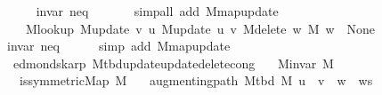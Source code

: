 \begin{isabellebody}
\ \ \ \ \isamarkupfalse%
\ invar{\isacharparenleft}{\kern0pt}{}{\isacharparenright}{\kern0pt}\ neq{\isacharparenleft}{\kern0pt}{}{\isacharcomma}{\kern0pt}\ {}{\isacharparenright}{\kern0pt}\isanewline
\ \ \ \ \isamarkupfalse%
\ {\isacharparenleft}{\kern0pt}simp{\isacharunderscore}{\kern0pt}all\ add{\isacharcolon}{\kern0pt}\ M{\isachardot}{\kern0pt}map{\isacharunderscore}{\kern0pt}update{\isacharparenright}{\kern0pt}\isanewline
\ \ \isamarkupfalse%
\isanewline
\ \ \ \ {\isachardoublequoteopen}M{\isacharunderscore}{\kern0pt}lookup\ {\isacharparenleft}{\kern0pt}M{\isacharunderscore}{\kern0pt}update\ v\ u\ {\isacharparenleft}{\kern0pt}M{\isacharunderscore}{\kern0pt}update\ u\ v\ {\isacharparenleft}{\kern0pt}M{\isacharunderscore}{\kern0pt}delete\ w\ M{\isacharparenright}{\kern0pt}{\isacharparenright}{\kern0pt}{\isacharparenright}{\kern0pt}\ w\ {\isacharequal}{\kern0pt}\ None{\isachardoublequoteclose}\isanewline
\ \ \ \ \isamarkupfalse%
\ invar{\isacharparenleft}{\kern0pt}{}{\isacharparenright}{\kern0pt}\ neq{\isacharparenleft}{\kern0pt}{}{\isacharparenright}{\kern0pt}\isanewline
\ \ \ \ \isamarkupfalse%
\ {\isacharparenleft}{\kern0pt}simp\ add{\isacharcolon}{\kern0pt}\ M{\isachardot}{\kern0pt}map{\isacharunderscore}{\kern0pt}update{\isacharparenright}{\kern0pt}\isanewline
{}\isamarkupfalse%
%
\endisatagproof
{\isafoldproof}%
%
\isadelimproof
\isanewline
%
\endisadelimproof
%
\isadeliminvisible
\isanewline
%
\endisadeliminvisible
%
\isataginvisible
{}\isamarkupfalse%
\ {\isacharparenleft}{\kern0pt}\ edmonds{\isacharunderscore}{\kern0pt}karp{\isacharparenright}{\kern0pt}\ M{\isacharunderscore}{\kern0pt}tbd{\isacharunderscore}{\kern0pt}update{\isacharunderscore}{\kern0pt}update{\isacharunderscore}{\kern0pt}delete{\isacharunderscore}{\kern0pt}cong{\isacharcolon}{\kern0pt}\isanewline
\ \ \ {\isachardoublequoteopen}M{\isachardot}{\kern0pt}invar\ M{\isachardoublequoteclose}\isanewline
\ \ \ {\isachardoublequoteopen}is{\isacharunderscore}{\kern0pt}symmetric{\isacharunderscore}{\kern0pt}Map\ M{\isachardoublequoteclose}\isanewline
\ \ \ {\isachardoublequoteopen}augmenting{\isacharunderscore}{\kern0pt}path\ {\isacharparenleft}{\kern0pt}M{\isacharunderscore}{\kern0pt}tbd\ M{\isacharparenright}{\kern0pt}\ {\isacharparenleft}{\kern0pt}u\ {\isacharhash}{\kern0pt}\ v\ {\isacharhash}{\kern0pt}\ w\ {\isacharhash}{\kern0pt}\ ws{\isacharparenright}{\kern0pt}{\isachardoublequoteclose}\isanewline

\end{isabellebody}
